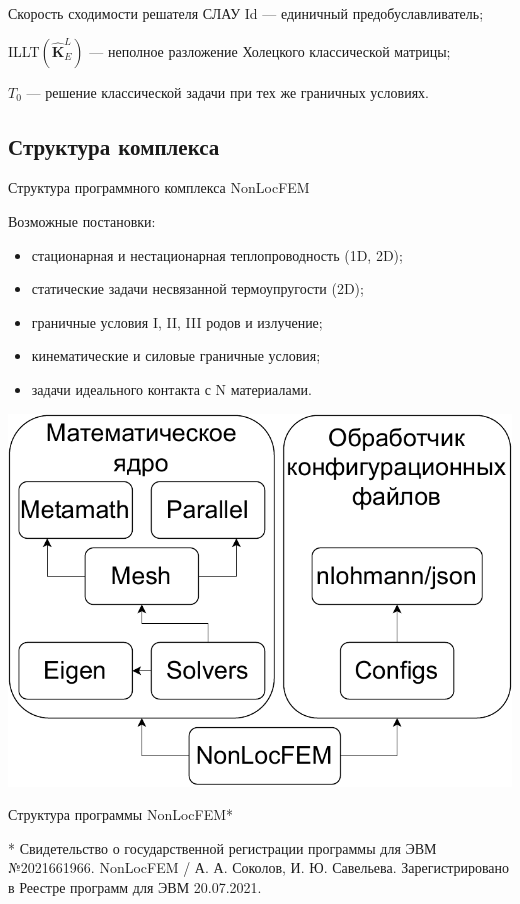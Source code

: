 \begin{frame}{Скорость сходимости решателя СЛАУ}
Id --- единичный предобуславливатель;

ILLT$\left( \widehat{\textbf{K}}^L_E \right)$ --- неполное разложение Холецкого классической матрицы;

$T_0$ --- решение классической задачи при тех же граничных условиях.
\end{frame}

\subsection{Структура комплекса}
\begin{frame}{Структура программного комплекса NonLocFEM}
\begin{minipage}{0.49\textwidth}
	Возможные постановки:
	\begin{itemize}
		\justifying
		\footnotesize
		\item стационарная и нестационарная теплопроводность (1D, 2D);
		\item статические задачи несвязанной термоупругости (2D);
		\item граничные условия I, II, III родов и излучение;
		\item кинематические и силовые граничные условия;
		\item задачи идеального контакта с N материалами.
	\end{itemize}
\end{minipage}
\hfill
\begin{minipage}{0.49\textwidth}
	\centering
	\includegraphics[width=\textwidth]{pics/NonLocFEMSchema.pdf}
	
	Структура программы NonLocFEM*
\end{minipage}
\bigskip

\justifying
* Свидетельство о государственной регистрации программы для ЭВМ \\
    №2021661966. NonLocFEM / А. А. Соколов, И. Ю. Савельева. Зарегистрировано в Реестре программ для ЭВМ 20.07.2021.
\end{frame}

